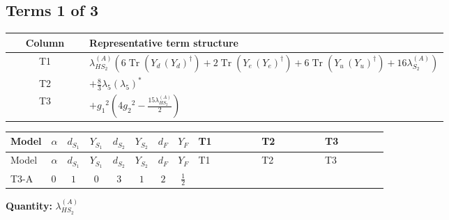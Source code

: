 \documentclass[8pt]{article}
\begin{document}
\begin{landscape}
\subsection*{Terms 1 of 3}
\begin{center}
\begin{tabular}{@{}c >{\raggedright\arraybackslash}p{0.82\linewidth}@{}}
\toprule
Column & Representative term structure \\
\midrule
T1 & \(\displaystyle {\lambda_{HS_2}^{(A)}} (6 \operatorname{Tr}\!\left({Y_d}\,\left({Y_d}\right)^{\dagger}\right)+2 \operatorname{Tr}\!\left({Y_e}\,\left({Y_e}\right)^{\dagger}\right)+6 \operatorname{Tr}\!\left({Y_u}\,\left({Y_u}\right)^{\dagger}\right)+16 {\lambda_{S_2}^{(A)}})\) \\
\midrule
T2 & \(\displaystyle +\frac{8}{3} {\lambda_5} \left({\lambda_5}\right)^{*}\) \\
\midrule
T3 & \(\displaystyle +{g_1}^2 \left(4 {g_2}^2-\frac{15 {\lambda_{HS_2}^{(A)}}}{2}\right)\) \\
\midrule
\bottomrule
\end{tabular}
\end{center}
\smallskip
\tiny
\begin{longtable}{@{}llcccccc >{\raggedright\arraybackslash}p{0.21\linewidth} >{\raggedright\arraybackslash}p{0.21\linewidth} >{\raggedright\arraybackslash}p{0.21\linewidth}@{}}
\toprule
Model & $\alpha$ & $d_{S_1}$ & $Y_{S_1}$ & $d_{S_2}$ & $Y_{S_2}$ & $d_F$ & $Y_F$ & T1 & T2 & T3 \\
\midrule
\endfirsthead
\toprule
Model & $\alpha$ & $d_{S_1}$ & $Y_{S_1}$ & $d_{S_2}$ & $Y_{S_2}$ & $d_F$ & $Y_F$ & T1 & T2 & T3 \\
\midrule
\endhead
T3-A & $0$ & $1$ & $0$ & $3$ & $1$ & $2$ & $\frac{1}{2}$ & \scriptsize\adjustbox{max width=\linewidth}{$\begin{gathered} {\lambda_{HS_2}^{(A)}} (6 \operatorname{Tr}\!\left({Y_d}\,\left({Y_d}\right)^{\dagger}\right)+2 \operatorname{Tr}\!\left({Y_e}\,\left({Y_e}\right)^{\dagger}\right)+6 \operatorname{Tr}\!\left({Y_u}\,\left({Y_u}\right)^{\dagger}\right)+16 {\lambda_{S_2}^{(A)}})\end{gathered}$} & \scriptsize\adjustbox{max width=\linewidth}{$\begin{gathered} +\frac{8}{3} {\lambda_5} \left({\lambda_5}\right)^{*}\end{gathered}$} & \scriptsize\adjustbox{max width=\linewidth}{$\begin{gathered} +{g_1}^2 \left(4 {g_2}^2-\frac{15 {\lambda_{HS_2}^{(A)}}}{2}\right)\end{gathered}$} \\
\midrule
\bottomrule
\end{longtable}
\clearpage
\noindent\textbf{Quantity: }$\lambda_{HS_2}^{(A)}$\par\smallskip

\end{landscape}
\end{document}
